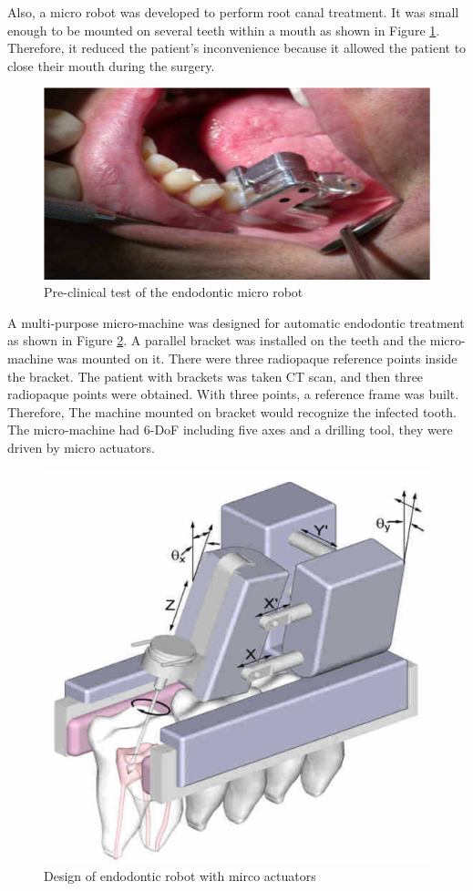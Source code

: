 \par
Also, a micro robot was developed to perform root canal treatment. It was small enough to be mounted on several teeth within a mouth as shown in Figure \ref{fig:NCTU_4}. Therefore, it reduced the patient's inconvenience because it allowed the patient to close their mouth during the surgery.
\par
\begin{figure}[htbp]
\begin{center}
	\includegraphics[width=0.85\linewidth]{Images/NCTU_4.png}
	\caption[Pre-clinical test of the endodontic micro robot]{Pre-clinical test of the endodontic micro robot \cite{dong2006wip}}	
	\label{fig:NCTU_4}
\end{center}
\end{figure}
\par
A multi-purpose micro-machine was designed for automatic endodontic treatment as shown in Figure \ref{fig:NCTU_1}. A parallel bracket was installed on the teeth and the micro-machine was mounted on it. There were three radiopaque reference points inside the bracket. The patient with brackets was taken CT scan, and then three radiopaque points were obtained. With three points, a reference frame was built. Therefore, The machine mounted on bracket would recognize the infected tooth. The micro-machine had 6-DoF including five axes and a drilling tool, they were driven by micro actuators.
\begin{figure}[htbp]
\begin{center}
	\includegraphics[width=0.55\linewidth]{Images/NCTU_1.png}
	\caption[Design of endodontic robot with mirco actuators]{
Design of endodontic robot with mirco actuators \cite{dong2006wip}
}\label{fig:NCTU_1}
\end{center}
\end{figure}
